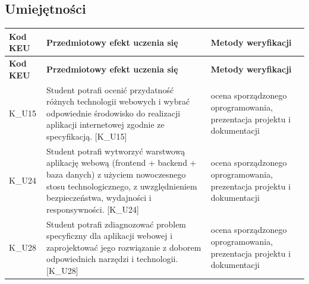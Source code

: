 \documentclass[12pt, a4paper]{article}
\newcommand{\thdrule}{\noalign{\global\setlength{\extrarowheight}{0pt}}}
\newcommand{\thdend}{\noalign{\global\setlength{\extrarowheight}{3pt}}}
\begin{document}
\subsection*{Umiejętności}
{\scriptsize
\begin{longtable}{m{1.6cm}m{9.0cm}m{4.2cm}}
\thdrule\toprule
\rowcolor{pjatkRed} {\color{white}\footnotesize\textbf{\vphantom{Ag}Kod KEU}} & {\color{white}\footnotesize\textbf{\vphantom{Ag}Przedmiotowy efekt uczenia się}} & {\color{white}\footnotesize\textbf{\vphantom{Ag}Metody weryfikacji}} \\
\midrule\thdend
\endfirsthead
\thdrule\toprule
\rowcolor{pjatkRed} {\color{white}\footnotesize\textbf{\vphantom{Ag}Kod KEU}} & {\color{white}\footnotesize\textbf{\vphantom{Ag}Przedmiotowy efekt uczenia się}} & {\color{white}\footnotesize\textbf{\vphantom{Ag}Metody weryfikacji}} \\
\midrule\thdend
\endhead
  \rowcolor{tableRowLight} K\_U15 & Student potrafi ocenić przydatność różnych technologii webowych i wybrać odpowiednie środowisko do realizacji aplikacji internetowej zgodnie ze specyfikacją. {[}K\_U15{]} & ocena sporządzonego oprogramowania, prezentacja projektu i dokumentacji \\
  \rowcolor{tableRowAlt} K\_U24 & Student potrafi wytworzyć warstwową aplikację webową (frontend + backend + baza danych) z użyciem nowoczesnego stosu technologicznego, z uwzględnieniem bezpieczeństwa, wydajności i responsywności. {[}K\_U24{]} & ocena sporządzonego oprogramowania, prezentacja projektu i dokumentacji \\
  \rowcolor{tableRowLight} K\_U28 & Student potrafi zdiagnozować problem specyficzny dla aplikacji webowej i zaprojektować jego rozwiązanie z doborem odpowiednich narzędzi i technologii. {[}K\_U28{]} & ocena sporządzonego oprogramowania, prezentacja projektu i dokumentacji \\
\bottomrule
\end{longtable}}
\end{document}
